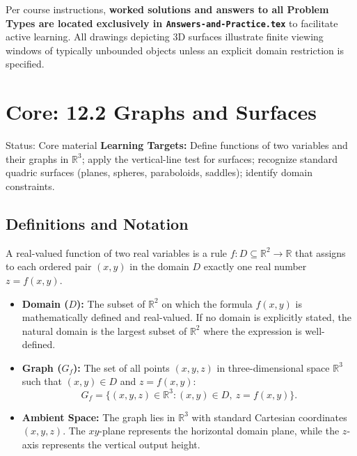 \documentclass[11pt,letterpaper]{article}
\newcommand{\R}{\mathbb{R}}
\begin{document}
Per course instructions, \textbf{worked solutions and answers to all Problem Types are located exclusively in \texttt{Answers-and-Practice.tex}} to facilitate active learning. All drawings depicting 3D surfaces illustrate finite viewing windows of typically unbounded objects unless an explicit domain restriction is specified.

\clearpage

\section{Core: 12.2 Graphs and Surfaces}\label{sec:graphs-surfaces}
\begin{statusbox}{Status: Core material}
\textbf{Learning Targets:} Define functions of two variables and their graphs in $\R^3$; apply the vertical-line test for surfaces; recognize standard quadric surfaces (planes, spheres, paraboloids, saddles); identify domain constraints.
\end{statusbox}

\subsection{Definitions and Notation}
A real-valued function of two real variables is a rule $f: D \subseteq \R^2 \to \R$ that assigns to each ordered pair $(x,y)$ in the domain $D$ exactly one real number $z = f(x,y)$.
\begin{itemize}[leftmargin=*]
    \item \textbf{Domain ($D$):} The subset of $\R^2$ on which the formula $f(x,y)$ is mathematically defined and real-valued. If no domain is explicitly stated, the natural domain is the largest subset of $\R^2$ where the expression is well-defined.
    \item \textbf{Graph ($G_f$):} The set of all points $(x,y,z)$ in three-dimensional space $\R^3$ such that $(x,y) \in D$ and $z = f(x,y)$:
    \[ G_f = \{(x,y,z) \in \R^3 : (x,y) \in D,\ z = f(x,y)\}. \]
    \item \textbf{Ambient Space:} The graph lies in $\R^3$ with standard Cartesian coordinates $(x,y,z)$. The $xy$-plane represents the horizontal domain plane, while the $z$-axis represents the vertical output height.
\end{itemize}
\end{document}
